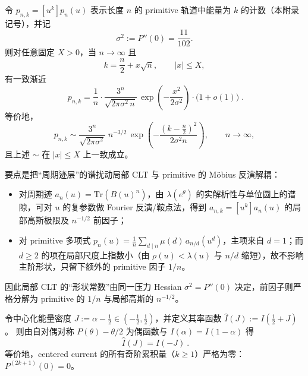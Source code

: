 \begin{theorem}\label{thm:prime-local-clt}
令 \(p_{n,k}=[u^k]p_n(u)\) 表示长度 \(n\) 的 primitive 轨道中能量为 \(k\) 的计数（本附录记号），并记
\[
\sigma^2:=P''(0)=\frac{11}{102}.
\]
则对任意固定 \(X>0\)，当 \(n\to\infty\) 且
\[
k=\frac{n}{2}+x\sqrt{n},\qquad |x|\le X,
\]
有一致渐近
\[
\boxed{\;
p_{n,k}
=\frac{1}{n}\cdot \frac{3^n}{\sqrt{2\pi\sigma^2\,n}}\,
\exp\!\left(-\frac{x^2}{2\sigma^2}\right)\cdot \bigl(1+o(1)\bigr)\; }.
\]
等价地，
\[
p_{n,k}\sim \frac{3^n}{\sqrt{2\pi\sigma^2}}\;n^{-3/2}\,
\exp\!\left(-\frac{(k-\frac{n}{2})^2}{2\sigma^2 n}\right),
\qquad n\to\infty,
\]
且上述 \(\sim\) 在 \(|x|\le X\) 上一致成立。
\end{theorem}
\begin{remark}[证明路线]\label{rem:prime-local-clt-proof-idea}
要点是把“周期迹层”的谱扰动局部 CLT 与 primitive 的 Möbius 反演解耦：
\begin{itemize}
  \item 对周期迹 \(a_n(u)=\mathrm{Tr}(B(u)^n)\)，由 \(\lambda(e^\theta)\) 的实解析性与单位圆上的谱隙，可对 \(u\) 的复参数做 Fourier 反演/鞍点法，得到 \(a_{n,k}=[u^k]a_n(u)\) 的局部高斯极限及 \(n^{-1/2}\) 前因子；
  \item 对 primitive 多项式 \(p_n(u)=\frac{1}{n}\sum_{d\mid n}\mu(d)\,a_{n/d}(u^d)\)，主项来自 \(d=1\)；而 \(d\ge 2\) 的项在局部尺度上指数小（由 \(\rho(u)<\lambda(u)\) 与 \(n/d\) 缩短），故不影响主阶形状，只留下额外的 primitive 因子 \(1/n\)。
\end{itemize}
因此局部 CLT 的“形状常数”由同一压力 Hessian \(\sigma^2=P''(0)\) 决定，前因子则严格分解为 primitive 的 \(1/n\) 与局部高斯的 \(n^{-1/2}\)。
\end{remark}

\begin{proposition}\label{prop:fluctuation-even}
令中心化能量密度 \(J:=\alpha-\tfrac12\in(-\tfrac12,\tfrac12)\)，并定义其率函数
\(
\widehat I(J):=I(\tfrac12+J)
\)。
则由自对偶对称 \(P(\theta)-\theta/2\) 为偶函数与 \(I(\alpha)=I(1-\alpha)\) 得
\[
\boxed{\ \widehat I(J)=\widehat I(-J)\ }.
\]
等价地，centered current 的所有奇阶累积量（\(k\ge 1\)）严格为零：\(P^{(2k+1)}(0)=0\)。
\end{proposition}


